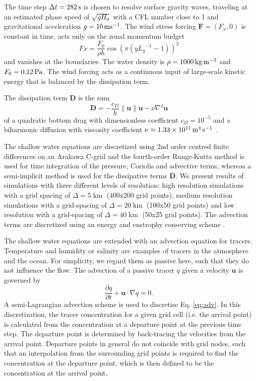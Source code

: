The time step $\Delta t = 282\operatorname{s}$ is chosen to resolve surface gravity waves,
traveling at an estimated phase speed of $\sqrt{gH_0}$ with a CFL number close to
1 and gravitational acceleration $g=10\operatorname{ms}^{-1}$. The wind stress
forcing $\mathbf{F} = (F_x,0)$ is constant in time, acts only on the zonal momentum
budget
\begin{equation}
Fx = \frac{F_0}{\rho h} \cos\left(\pi\left(y{L_y}^{-1} - 1\right)\right)^2
\end{equation}
and vanishes at the boundaries. The water density is $\rho = 1000\operatorname{kg}\operatorname{m}^{-3}$
and $F_0 = 0.12\operatorname{Pa}$. The wind forcing acts as a continuous input of large-scale
kinetic energy that is balanced by the dissipation term.

The dissipation term $\mathbf{D}$ is the sum
\begin{equation}
\mathbf{D} = -\frac{c_D}{h}\| \mathbf{u} \| \mathbf{u} - \nu \nabla^4 \mathbf{u}
\label{eq:diss}
\end{equation}
of a quadratic bottom drag with dimensionless coefficient $c_D = 10^{-5}$ \citep{Arbic2008}
and a biharmonic diffusion with viscosity coefficient $\nu \approx 1.33\times10^{11} \operatorname{m}^4\operatorname{s}^{-1}$ \citep{Griffies2000}.

The shallow water equations are discretized using 2nd order centred finite differences
on an Arakawa C-grid \citep{Arakawa1977} and the fourth-order Runge-Kutta method \citep{Butcher2016}
is used for time integration of the pressure, Coriolis and advective terms, whereas a
semi-implicit method is used for the dissipative terms $\mathbf{D}$. We present results
of simulations with three different levels of resolution: high resolution simulations
with a grid spacing of $\Delta = 5\operatorname{km}$ (400x200 grid points), medium
resolution simulations with a grid-spacing of $\Delta = 20\operatorname{km}$
(100x50 grid points) and low resolution with a grid-spacing of $\Delta = 40\operatorname{km}$
(50x25 grid points). The advection terms are discretized using an energy and
enstrophy conserving scheme \citep{Arakawa1990}.

The shallow water equations are extended with an advection equation for tracers.
Temperature and humidity or salinity are examples of tracers in the atmosphere
and the ocean. For simplicity, we regard them as passive here, such that they do not
influence the flow. The advection of a passive tracer $q$ given a velocity $\mathbf{u}$
is governed by
\begin{equation}
\frac{\partial q}{\partial t} + \mathbf{u} \cdot \nabla q = 0.
\label{eq:adv}
\end{equation}
A semi-Lagrangian advection scheme \citep{Smolarkiewicz1992} is used to discretise
Eq. \ref{eq:adv}. In this discretization, the tracer concentration for a given grid cell
(i.e. the arrival point) is calculated from the concentration at a departure point
at the previous time step. The departure point is determined by back-tracing the
velocities from the arrival point. Departure points in general
do not coincide with grid nodes, such that an interpolation from the surrounding grid
points is required to find the concentration at the departure point, which is then
defined to be the concentration at the arrival point.

